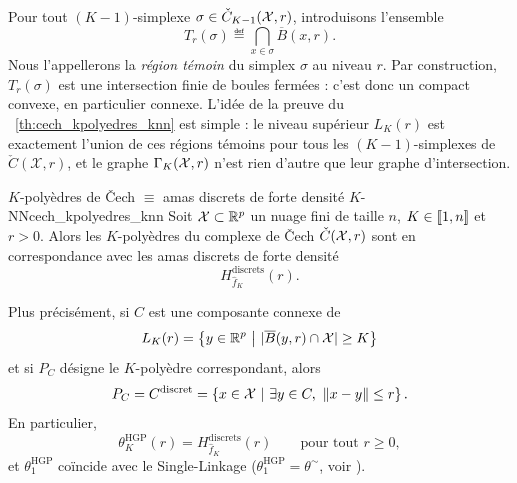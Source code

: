 Pour tout $(K-1)$-simplexe $\sigma\in \check C_{K-1}(\mathcal{X},r)$, introduisons l'ensemble
\[
    T_r(\sigma) \eqdef \bigcap_{x\in \sigma} \overline B(x,r).
\]
Nous l'appellerons la \emph{région témoin} du simplex $\sigma$ au niveau $r$. Par construction, $T_r(\sigma)$ est une intersection finie de boules fermées : c'est donc un compact convexe, en particulier connexe.
L'idée de la preuve du \Th~\ref{th:cech_kpolyedres_knn} est simple : le niveau supérieur $L_K(r)$ est exactement l'union de ces régions témoins pour tous les $(K-1)$-simplexes de $\check C(\mathcal X, r)$, et le graphe $\Gamma_K(\mathcal{X},r)$ n'est rien d'autre que leur graphe d'intersection.

\begin{Theoreme}{$K$-polyèdres de \v Cech $\equiv$ amas discrets de forte densité $K$-NN}{cech_kpolyedres_knn}
Soit $\mathcal{X}\subset \mathbb R^p$ un nuage fini de taille $n$, $K\in \left[\!\left[ 1,n \right]\!\right]$ et $r>0$. Alors les $K$-polyèdres du complexe de \v Cech $\check C(\mathcal{X},r)$ sont en correspondance avec les amas discrets de forte densité
\[
    H^{\mathrm{discrets}}_{\widehat f_K}(r).
\]

Plus précisément, si $C$ est une composante connexe de
\[
    L_K(r)=\left\{ y\in\mathbb R^p \ \middle|\ |\overline B(y,r)\cap \X|\ge K \right\}
\]
et si $P_C$ désigne le $K$-polyèdre correspondant, alors
\[
    P_C = C^{\mathrm{discret}} = \left\{ x\in \X \ \middle|\ \exists y\in C,\ \norme{x-y}\le r \right\}.
\]
En particulier,
\[
\boxed{
    \theta^{\mathrm{HGP}}_K(r) = H^{\mathrm{discrets}}_{\widehat f_K}(r)
    \qquad\text{pour tout } r\ge 0,
    }
\]
et $\theta^{\mathrm{HGP}}_1 $ coïncide avec le Single-Linkage ($\theta^{\mathrm{HGP}}_1 = \theta^\sim$, voir ).
\end{Theoreme}

